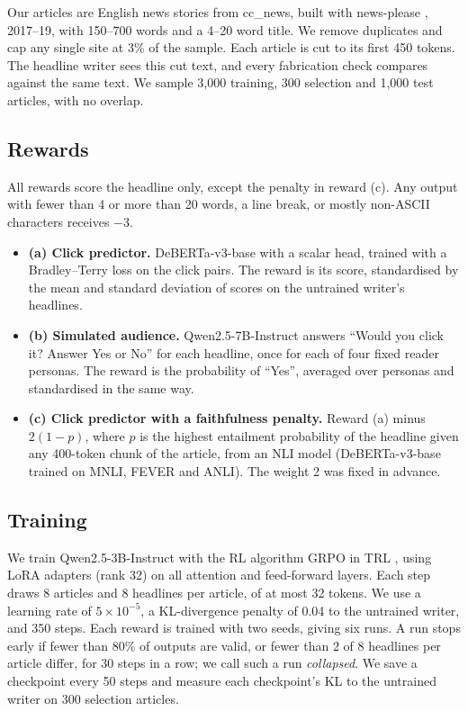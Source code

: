 Our articles are English news stories from cc\_news, built with news-please \citep{hamborg2017newsplease}, 2017--19, with 150--700 words and a 4--20 word title. We remove duplicates and cap any single site at 3\% of the sample. Each article is cut to its first 450 tokens. The headline writer sees this cut text, and every fabrication check compares against the same text. We sample 3,000 training, 300 selection and 1,000 test articles, with no overlap.

\subsection{Rewards}
All rewards score the headline only, except the penalty in reward (c). Any output with fewer than 4 or more than 20 words, a line break, or mostly non-ASCII characters receives $-3$.
\begin{itemize}
\item \textbf{(a) Click predictor.} DeBERTa-v3-base \citep{he2023debertav3} with a scalar head, trained with a Bradley--Terry loss \citep{bradley1952rank} on the click pairs. The reward is its score, standardised by the mean and standard deviation of scores on the untrained writer's headlines.
\item \textbf{(b) Simulated audience.} Qwen2.5-7B-Instruct \citep{qwen2024qwen25} answers ``Would you click it? Answer Yes or No'' for each headline, once for each of four fixed reader personas. The reward is the probability of ``Yes'', averaged over personas and standardised in the same way.
\item \textbf{(c) Click predictor with a faithfulness penalty.} Reward (a) minus $2(1-p)$, where $p$ is the highest entailment probability of the headline given any 400-token chunk of the article, from an NLI model (DeBERTa-v3-base trained on MNLI, FEVER and ANLI). The weight 2 was fixed in advance.
\end{itemize}

\subsection{Training}
We train Qwen2.5-3B-Instruct with the RL algorithm GRPO \citep{shao2024deepseekmath} in TRL \citep{vonwerra2020trl}, using LoRA adapters \citep{hu2022lora} (rank 32) on all attention and feed-forward layers. Each step draws 8 articles and 8 headlines per article, of at most 32 tokens. We use a learning rate of $5\times10^{-5}$, a KL-divergence penalty of 0.04 to the untrained writer, and 350 steps. Each reward is trained with two seeds, giving six runs. A run stops early if fewer than 80\% of outputs are valid, or fewer than 2 of 8 headlines per article differ, for 30 steps in a row; we call such a run \emph{collapsed}. We save a checkpoint every 50 steps and measure each checkpoint's KL to the untrained writer on 300 selection articles.


